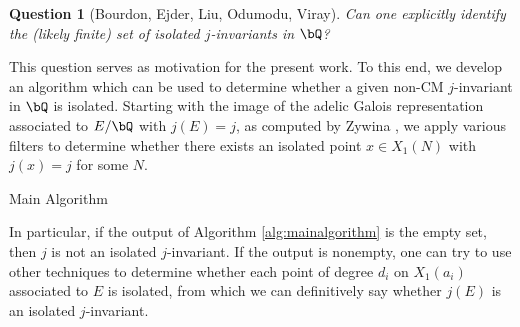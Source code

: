 \documentclass[11pt,reqno]{amsart}
\theoremstyle{plain}
\newtheorem{theorem}{Theorem}%
\newtheorem{question}[theorem]{Question}
\theoremstyle{definition}
\newcommand{\Q}{\bQ}
\begin{document}
\begin{question}[Bourdon, Ejder, Liu, Odumodu, Viray]
    Can one explicitly identify the (likely finite) set of isolated $j$-invariants in $\Q$?
\end{question}



This question serves as motivation for the present work. To this end, we develop an algorithm which can be used to determine whether a given non-CM $j$-invariant in $\Q$ is isolated. Starting with the image of the adelic Galois representation associated to $E/\Q$ with $j(E)=j$, as computed by Zywina \cite{ZywinaAlgorithm}, we apply various filters to determine whether there exists an isolated point $x \in X_1(N)$ with $j(x)=j$ for some $N$.

\begin{algorithm}[h!]
\renewcommand{\thealgocf}{} %
\caption{Main Algorithm} 
    \KwIn{A non-CM $j$-invariant $j \in \Q$.}
\end{algorithm}

\noindent
In particular, if the output of Algorithm \ref{alg:mainalgorithm} is the empty set, then $j$ is not an isolated $j$-invariant.
If the output is nonempty,
one can try to use other techniques to determine whether each point of degree $d_i$ on $X_1(a_i)$ associated to $E$ is isolated, from which we can definitively say whether $j(E)$ is an isolated $j$-invariant.
\end{document}
